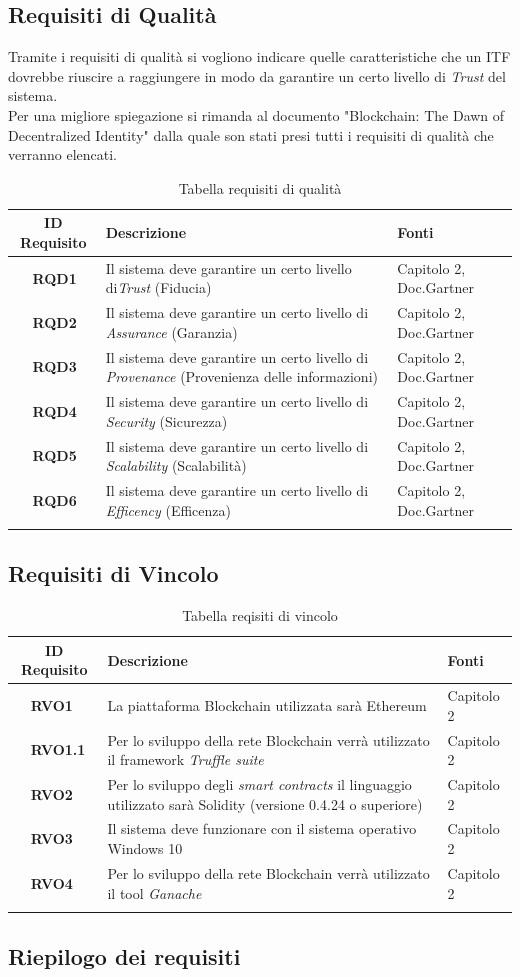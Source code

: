 \subsection{Requisiti di Qualità}
Tramite i requisiti di qualità si vogliono indicare quelle caratteristiche che un \gls{ITF} dovrebbe riuscire a raggiungere in modo da garantire un certo livello di \textit{Trust} del sistema.\\
Per una migliore spiegazione si rimanda al documento "Blockchain: The Dawn of Decentralized Identity"\cite{ITF_gartner} dalla quale son stati presi tutti i requisiti di qualità che verranno elencati.
\begin{longtable}{|r l|p{10cm}|p{2cm}|}
	\hline
	\multicolumn{2}{|c|}{\textbf{ID Requisito}} & \textbf{Descrizione} & \textbf{Fonti}\tabularnewline
	\hline
	&\textbf{RQD1}&Il sistema deve garantire un certo livello di\textit{Trust} (Fiducia)& Capitolo 2, Doc.Gartner\cite{ITF_gartner}\\\hline
	&\textbf{RQD2}&Il sistema deve garantire un certo livello di \textit{Assurance} (Garanzia)& Capitolo 2, Doc.Gartner\cite{ITF_gartner}\\\hline
	&\textbf{RQD3}&Il sistema deve garantire un certo livello di \textit{Provenance} (Provenienza delle informazioni)& Capitolo 2, Doc.Gartner\cite{ITF_gartner}\\\hline
	&\textbf{RQD4}&Il sistema deve garantire un certo livello di \textit{Security} (Sicurezza)& Capitolo 2, Doc.Gartner\cite{ITF_gartner}\\\hline
	&\textbf{RQD5}&Il sistema deve garantire un certo livello di \textit{Scalability} (Scalabilità)& Capitolo 2, Doc.Gartner\cite{ITF_gartner}\\\hline
	&\textbf{RQD6}&Il sistema deve garantire un certo livello di \textit{Efficency} (Efficenza)& Capitolo 2, Doc.Gartner\cite{ITF_gartner}\\\hline
	\caption{Tabella requisiti di qualità}
\end{longtable}
\subsection{Requisiti di Vincolo}
\begin{longtable}{|r l|p{10cm}|p{2cm}|}
	\hline
	\multicolumn{2}{|c|}{\textbf{ID Requisito}} & \textbf{Descrizione} & \textbf{Fonti}\tabularnewline
	\hline
	&\textbf{RVO1}& La piattaforma Blockchain utilizzata sarà Ethereum & Capitolo 2\\\hline
	&\textbf{RVO1.1}& Per lo sviluppo della rete Blockchain verrà utilizzato il \gls{framework} \textit{Truffle suite} & Capitolo 2\\\hline
	&\textbf{RVO2}& Per lo sviluppo degli \textit{smart contracts} il linguaggio utilizzato sarà Solidity (versione 0.4.24 o superiore) & Capitolo 2\\\hline
	&\textbf{RVO3}& Il sistema deve funzionare con il sistema operativo Windows 10 & Capitolo 2\\\hline
	&\textbf{RVO4}& Per lo sviluppo della rete Blockchain verrà utilizzato il tool \textit{Ganache} & Capitolo 2\\\hline
	\caption{Tabella reqisiti di vincolo}
\end{longtable}
\subsection{Riepilogo dei requisiti}